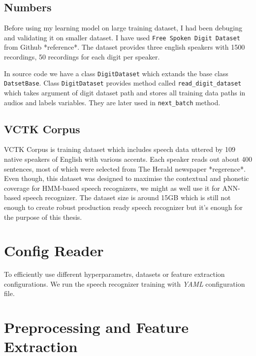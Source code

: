 \subsection{Numbers}

Before using my learning model on large training dataset, I had been debuging and validating it on smaller dataset.
I have used \texttt{Free Spoken Digit Dataset} from Github *reference*.
The dataset provides three english speakers with 1500 recordings, 50 recordings for each digit per speaker.

In source code we have a class \texttt{DigitDataset} which extands the base class \texttt{DatsetBase}.
Class \texttt{DigitDataset} provides method called \texttt{read\_digit\_dataset} which takes argument of digit dataset path and stores all training data paths in audios and labels variables.
They are later used in \texttt{next\_batch} method.

\subsection{VCTK Corpus}

VCTK Corpus is training dataset which includes speech data uttered by 109 native speakers of English with various accents.
Each speaker reads out about 400 sentences, most of which were selected from The Herald newspaper *regerence*.
Even though, this dataset was designed to maximise the contextual and phonetic coverage for HMM-based speech recognizers, we might as well use it for ANN-based speech recognizer.
The dataset size is around 15GB which is still not enough to create robust production ready speech recognizer but it's enough for the purpose of this thesis.

\section{Config Reader}

To efficiently use different hyperparametrs, datasets or feature extraction configurations.
We run the speech recognizer training with \textit{YAML} configuration file.



\section{Preprocessing and Feature Extraction}


